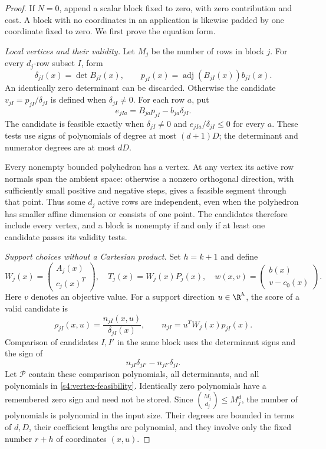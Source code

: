 \begin{proof}
If $N=0$, append a scalar block fixed to zero, with zero contribution
and cost. A block with no coordinates in an application is likewise
padded by one coordinate fixed to zero. We first prove the equation form.

\emph{Local vertices and their validity.}
Let $M_j$ be the number of rows in block $j$. For every $d_j$-row
subset $I$, form
\[
 \delta_{jI}(x)=\det B_{jI}(x),\qquad
 p_{jI}(x)=\operatorname{adj}(B_{jI}(x))b_{jI}(x).
\]
An identically zero determinant can be discarded. Otherwise the
candidate $v_{jI}=p_{jI}/\delta_{jI}$ is defined when
$\delta_{jI}\ne0$. For each row $a$, put
\begin{equation}
 e_{jIa}=B_{ja}p_{jI}-b_{ja}\delta_{jI}.
 \label{s4:vertex-feasibility}
\end{equation}
The candidate is feasible exactly when $\delta_{jI}\ne0$ and
$e_{jIa}/\delta_{jI}\le0$ for every $a$. These tests use signs of
polynomials of degree at most $(d+1)D$; the determinant and numerator
degrees are at most $dD$.

Every nonempty bounded polyhedron has a vertex. At any vertex its
active row normals span the ambient space: otherwise a nonzero
orthogonal direction, with sufficiently small positive and negative
steps, gives a feasible segment through that point. Thus some $d_j$
active rows are independent, even when the polyhedron has smaller
affine dimension or consists of one point. The candidates therefore
include every vertex, and a block is nonempty if and only if at least
one candidate passes its validity tests.

\emph{Support choices without a Cartesian product.}
Set $h=k+1$ and define
\[
 W_j(x)=\begin{pmatrix}A_j(x)\\c_j(x)^T\end{pmatrix},\quad
 T_j(x)=W_j(x)P_j(x),\quad
 w(x,v)=\begin{pmatrix}b(x)\\v-c_0(x)\end{pmatrix}.
\]
Here $v$ denotes an objective value. For a support direction
$u\in\R^h$, the score of a valid candidate is
\[
 \rho_{jI}(x,u)=\frac{n_{jI}(x,u)}{\delta_{jI}(x)},\qquad
 n_{jI}=u^TW_j(x)p_{jI}(x).
\]
Comparison of candidates $I,I'$ in the same block uses the determinant
signs and the sign of
\begin{equation}
 n_{jI}\delta_{jI'}-n_{jI'}\delta_{jI}.
 \label{s4:score-comparison}
\end{equation}
Let $\mathcal P$ contain these comparison polynomials, all determinants,
and all polynomials in \eqref{s4:vertex-feasibility}. Identically zero
polynomials have a remembered zero sign and need not be stored. Since
$\binom{M_j}{d_j}\le M_j^d$, the number of polynomials is polynomial
in the input size. Their degrees are bounded in terms of $d,D$, their
coefficient lengths are polynomial, and they involve only the fixed
number $r+h$ of coordinates $(x,u)$.


\end{proof}
